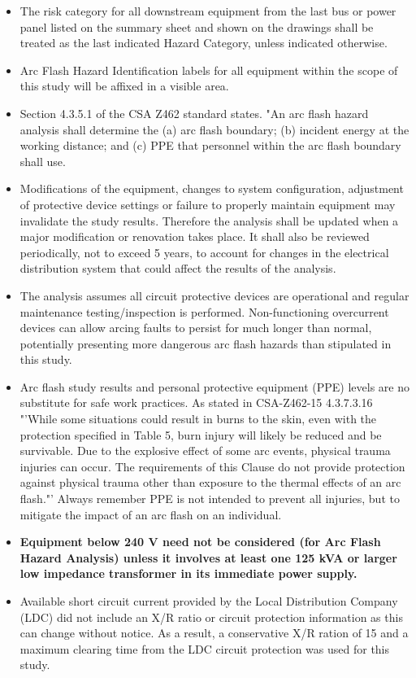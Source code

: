 \begin{itemize} 
\item The risk category for all downstream equipment from the last bus or power panel listed on the summary sheet and shown on the drawings shall be treated as the last indicated Hazard Category, unless indicated otherwise.

\item Arc Flash Hazard Identification labels for all equipment within the scope of this study will be affixed in a visible area.

\item Section 4.3.5.1 of the CSA Z462 standard states. "An arc flash hazard analysis shall determine the (a) arc flash boundary; (b) incident energy at the working distance; and (c) PPE that personnel within the arc flash boundary shall use.\cite{CSA}

\item Modifications of the equipment, changes to system configuration, adjustment of protective device settings or failure to properly maintain equipment may invalidate the study results. Therefore the analysis shall be updated when a major modification or renovation takes place. It shall also be reviewed periodically, not to exceed 5 years, to account for changes in the electrical distribution system that could affect the results of the analysis.\cite{CSA}

\item The analysis assumes all circuit protective devices are operational and regular maintenance testing/inspection is performed.  Non-functioning overcurrent devices can allow arcing faults to persist for much longer than normal, potentially presenting more dangerous arc flash hazards than stipulated in this study.

\item Arc flash study results and personal protective equipment (PPE) levels are no substitute for safe work practices.  As stated in CSA-Z462-15 4.3.7.3.16 "'While some situations could result in burns to the skin, even with the protection specified in Table 5, burn injury will likely be reduced and be survivable. Due to the explosive effect of some arc events, physical trauma injuries can occur. The requirements of this Clause do not provide protection against physical trauma other than exposure to the thermal effects of an arc flash."' \cite{CSA} Always remember PPE is not intended to prevent all injuries, but to mitigate the impact of an arc flash on an individual.
 
\item\textbf{Equipment below 240 V need not be considered (for Arc Flash Hazard Analysis) unless it involves at least one 125 kVA or larger low impedance transformer in its immediate power supply.}\cite{IEEE}	

\item Available short circuit current provided by the Local Distribution Company (LDC) did not include an X/R ratio or circuit protection information as this can change without notice. As a result, a conservative X/R ration of 15 and a maximum clearing time from the LDC circuit protection was used for this study. 
\end{itemize}
\pagebreak
